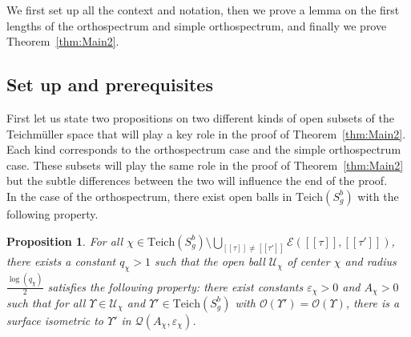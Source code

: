 \documentclass[a4paper,12pt]{article}
\newtheorem{proposition}[theorem]{Proposition}
\theoremstyle{definition}
\theoremstyle{remark}
\begin{document}
We first set up all the context and notation, then we prove a lemma on the first lengths of the orthospectrum and simple orthospectrum, and finally we prove Theorem~\ref{thm:Main2}.













\subsection{Set up and prerequisites}\label{subsec:SetUp}

First let us state two propositions on two different kinds of open subsets of the Teichmüller space that will play a key role in the proof of Theorem~\ref{thm:Main2}. Each kind corresponds to the orthospectrum case and the simple orthospectrum case. These subsets will play the same role in the proof of Theorem~\ref{thm:Main2} but the subtle differences between the two will influence the end of the proof.\\


In the case of the orthospectrum, there exist open balls in $\mathrm{Teich}(S_g^b)$ with the following property.

\begin{proposition}\label{prop:Ux}
    For all $\chi \in \mathrm{Teich}(S_g^b) \setminus \bigcup_{[[\tau]]\neq [[\tau']]} \mathcal{E}([[\tau]],[[\tau']])$, there exists a constant $q_\chi>1$ such that the open ball $\mathcal{U}_\chi$ of center $\chi$ and radius $\frac{\log(q_\chi)}{2}$ satisfies the following property: there exist constants $\varepsilon_\chi>0$ and $A_\chi>0$ such that for all $\Upsilon \in \mathcal{U}_\chi$ and $\Upsilon' \in \mathrm{Teich}(S_g^b)$ with $\mathcal{O}(\Upsilon')=\mathcal{O}(\Upsilon)$, there is a surface isometric to $\Upsilon'$ in $\mathcal{Q}(A_\chi,\varepsilon_\chi)$.
\end{proposition}
\end{document}
